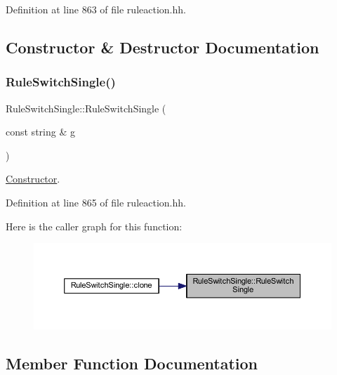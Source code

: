Definition at line 863 of file ruleaction.\+hh.



\subsection{Constructor \& Destructor Documentation}
\mbox{\label{class_rule_switch_single_a0c4e909024de24f8c437a8cde2ed99e6}} 
\subsubsection{\texorpdfstring{RuleSwitchSingle()}{RuleSwitchSingle()}}
{\footnotesize\ttfamily Rule\+Switch\+Single\+::\+Rule\+Switch\+Single (\begin{DoxyParamCaption}\item[{const string \&}]{g }\end{DoxyParamCaption})\hspace{0.3cm}{\ttfamily [inline]}}



\mbox{\hyperlink{class_constructor}{Constructor}}. 



Definition at line 865 of file ruleaction.\+hh.

Here is the caller graph for this function\+:
\nopagebreak
\begin{figure}[H]
\begin{center}
\leavevmode
\includegraphics[width=350pt]{class_rule_switch_single_a0c4e909024de24f8c437a8cde2ed99e6_icgraph}
\end{center}
\end{figure}


\subsection{Member Function Documentation}
\mbox{\label{class_rule_switch_single_ab884de26def65edb9ade3b981c6983e1}} 
